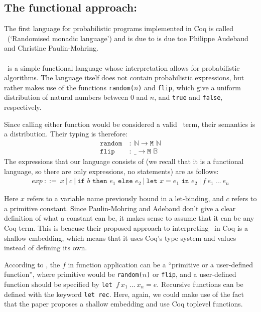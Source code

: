 \documentclass[11pt, leqno, titlepage]{article}
\theoremstyle{definition}
\begin{document}
\subsection{The functional approach: \rml}\label{sec:rml}
The first language for probabilistic programs implemented in Coq is called \rml\ 
(`Randomised monadic language') and is due to is due toe Philippe Audebaud and
Christine Paulin-Mohring\cite{rml-paper}.
\\ \\
\rml\ is a simple functional language whose interpretation allows for probabilistic
algorithms. The language itself does not contain probabilistic expressions, but
rather makes use of the functions \texttt{random($n$)} and \texttt{flip}, which give
a uniform distribution of natural numbers between 0 and $n$, and \texttt{true} and
\texttt{false}, respectively.

Since calling either function would be considered a valid \rml\ term, their semantics
is a distribution. Their typing is therefore:
\begin{align*}
  \texttt{random} &~:~\mathbb{N} \to \texttt{M }\mathbb{N}\\
  \texttt{flip}   &~:~ \_ \to \texttt{M }\mathbb{B}
\end{align*}
\noindent The expressions that our language consists of (we recall that it is a functional
language, so there are only expressions, no statements) are as follows:
\begin{align*}
  exp~::= ~ x~\vert ~ c~\vert ~ \texttt{if }b\texttt{ then }e_1\texttt{ else } e_2~
  \vert ~ \texttt{let }x = e_1 \texttt{ in }e_2~\vert ~ f~e_1~\dots~e_n
\end{align*}

Here $x$ refers to a variable name previously bound in a let-binding, and $c$ refers
to a primitive constant. Since Paulin-Mohring and Adebaud don't give a clear
definition of what a constant can be, it makes sense to assume that it can be any
Coq term. This is beacuse their proposed approach to interpreting \rml\ in Coq is a
shallow embedding, which means that it uses Coq's type system and values instead of
defining its own. 

According to \cite{rml-paper}, the $f$ in function application can be a ``primitive
or a user-defined function'', where primitive would be \texttt{random($n$)} or
\texttt{flip}, and a user-defined function should be specified by \texttt{let
}$f~x_1~\dots~ x_n= e$. Recursive functions can be defined with the keyword
\texttt{let rec}. Here, again, we could make use of the fact that the paper proposes
a shallow embedding and use Coq toplevel functions.
\end{document}
